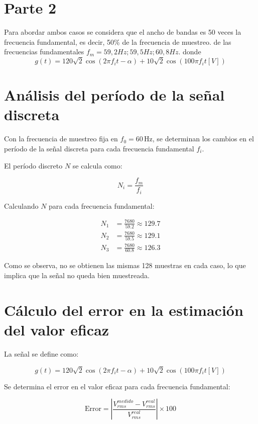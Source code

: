 \documentclass[conference]{IEEEtran}
\theoremstyle{mytheoremstyle}
\theoremstyle{mytheoremstyle}
\theoremstyle{myproblemstyle}
\begin{document}
            \section{Parte 2}

            Para abordar ambos casos se considera que el ancho de bandas es 50 veces la frecuencia fundamental, es decir, 50\% de la frecuencia de muestreo. de las frecuencias fundamentales $f_m={59,2 Hz; 59,5 Hz; 60,8 Hz}.$
            donde \\
            \[
            g(t) = 120\sqrt{2} \cos(2\pi f_i t - \alpha) + 10\sqrt{2} \cos(100\pi f_i t [V])
            \]
            
\section{Análisis del período de la señal discreta}
Con la frecuencia de muestreo fija en \( f_0 = 60 \, \text{Hz} \), se determinan los cambios en el período de la señal discreta para cada frecuencia fundamental \( f_i \).

El período discreto \( N \) se calcula como:

\begin{equation}
    N_i = \frac{f_m}{f_i}
\end{equation}

Calculando \( N \) para cada frecuencia fundamental:

\begin{align*}
    N_1 &= \frac{7680}{59.2} \approx 129.7 \\
    N_2 &= \frac{7680}{59.5} \approx 129.1 \\
    N_3 &= \frac{7680}{60.8} \approx 126.3 
\end{align*}

Como se observa, no se obtienen las mismas 128 muestras en cada caso, lo que implica que la señal no queda bien muestreada.

\section{Cálculo del error en la estimación del valor eficaz}
La señal se define como:

\[
g(t) = 120\sqrt{2} \cos(2\pi f_i t - \alpha) + 10\sqrt{2} \cos(100\pi f_i t [V])
\]

Se determina el error en el valor eficaz para cada frecuencia fundamental:

\begin{equation}
    \text{Error} = \left|\frac{V_{rms}^{medido} - V_{rms}^{real}}{V_{rms}^{real}}\right| \times 100
\end{equation}
\end{document}
